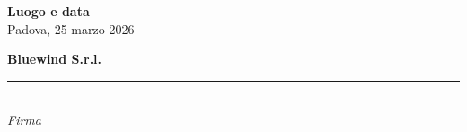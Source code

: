 \documentclass[a4paper, 10pt, colorlinks=true, linkcolor=black, urlcolor=blue, citecolor=blue, hidelinks]{article}
\begin{document}
\vfill %
\enlargethispage{3.5cm} %

\noindent
\begin{minipage}[t]{0.45\textwidth}
  \textbf{Luogo e data} \\
  \vspace{0.5cm}
  Padova, 25 marzo 2026
\end{minipage}
\hfill
\begin{minipage}[t]{0.45\textwidth}
  \raggedleft
  \textbf{Bluewind S.r.l.} \\
  \vspace{1.2cm}
  \rule{6cm}{0.4pt} \\
  \textit{Firma}
\end{minipage}
\end{document}
